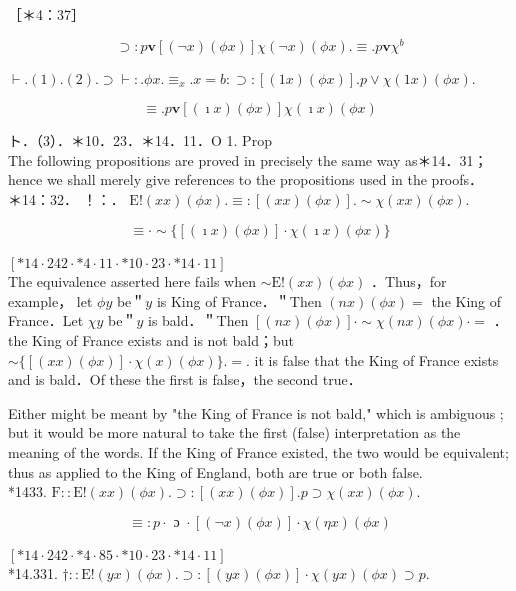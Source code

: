 \documentclass[10pt]{article}
\begin{document}
［＊4：37］


\begin{equation*}
\supset: p \mathbf{v}[(\neg x)(\phi x)] \chi(\neg x)(\phi x) . \equiv . p \mathbf{v} \chi^{b} \tag{2}
\end{equation*}


$\vdash .(1) .(2) . \supset \vdash: . \phi x . \equiv_{x} . x=b: \supset:[(1 x)(\phi x)] . p \vee \chi(1 x)(\phi x)$.


\begin{equation*}
\equiv . p \mathbf{v}[(\imath x)(\phi x)] \chi(\imath x)(\phi x) \tag{3}
\end{equation*}


ト．（3）．＊10．23．＊14．11．O 1. Prop\\
The following propositions are proved in precisely the same way as＊14．31； hence we shall merely give references to the propositions used in the proofs．\\
＊14：32． ！：． $\mathrm{E}!(x x)(\phi x) . \equiv:[(x x)(\phi x)] . \sim \chi(x x)(\phi x)$.

$$
\equiv \cdot \sim\{[(\imath x)(\phi x)] \cdot \chi(\imath x)(\phi x)\}
$$

$[* 14 \cdot 242 \cdot * 4 \cdot 11 \cdot * 10 \cdot 23 \cdot * 14 \cdot 11]$\\
The equivalence asserted here fails when $\sim \mathrm{E}!(x x)(\phi x)$ ．Thus，for example， let $\phi y$ be＂$y$ is King of France．＂Then $(n x)(\phi x)=$ the King of France．Let $\chi y$ be＂$y$ is bald．＂Then $[(n x)(\phi x)] \cdot \sim \chi(n x)(\phi x) \cdot=$ ．the King of France exists and is not bald；but $\sim\{[(x x)(\phi x)] \cdot \chi(x)(\phi x)\} .=$. it is false that the King of France exists and is bald．Of these the first is false，the second true．

Either might be meant by "the King of France is not bald," which is ambiguous ; but it would be more natural to take the first (false) interpretation as the meaning of the words. If the King of France existed, the two would be equivalent; thus as applied to the King of England, both are true or both false.\\
*1433. $\mathrm{F}:: \mathrm{E}!(x x)(\phi x) . \supset:[(x x)(\phi x)] . p \supset \chi(x x)(\phi x)$.

$$
\equiv: p \cdot \text { ɔ } \cdot[(\neg x)(\phi x)] \cdot \chi(\eta x)(\phi x)
$$

$[* 14 \cdot 242 \cdot * 4 \cdot 85 \cdot * 10 \cdot 23 \cdot * 14 \cdot 11]$\\
*14.331. $\dagger:: \mathrm{E}!(y x)(\phi x) . \supset:[(y x)(\phi x)] \cdot \chi(y x)(\phi x) \supset p$.
\end{document}
